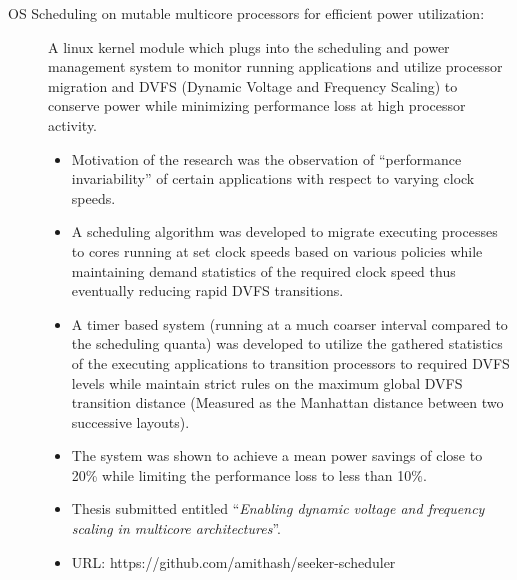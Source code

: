 \begin{description}
\item[OS Scheduling on mutable multicore processors for efficient power utilization:] A linux kernel module which plugs into the scheduling and power management system to monitor running applications and utilize processor migration and DVFS (Dynamic Voltage and Frequency Scaling) to conserve power while minimizing performance loss at high processor activity.
\begin{itemize}
\item Motivation of the research was the observation of ``performance invariability'' of certain applications with respect to varying clock speeds.
\item A scheduling algorithm was developed to migrate executing processes to cores running at set clock speeds based on various policies while maintaining demand statistics of the required clock speed thus eventually reducing rapid DVFS transitions.
\item A timer based system (running at a much coarser interval compared to the scheduling quanta) was developed to utilize the gathered statistics of the executing applications to transition processors to required DVFS levels while maintain strict rules on the maximum global DVFS transition distance (Measured as the Manhattan distance between two successive layouts).
\item The system was shown to achieve a mean power savings of close to 20\% while limiting the performance loss to less than 10\%.
\item Thesis submitted entitled ``\textit{Enabling dynamic voltage and frequency scaling in multicore architectures}''.
\item URL: https://github.com/amithash/seeker-scheduler
\end{itemize}




\end{description}
